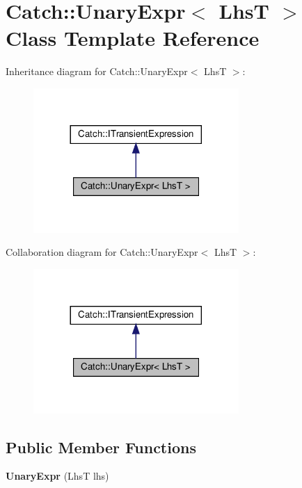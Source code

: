 \hypertarget{classCatch_1_1UnaryExpr}{}\section{Catch\+::Unary\+Expr$<$ LhsT $>$ Class Template Reference}
\label{classCatch_1_1UnaryExpr}


Inheritance diagram for Catch\+::Unary\+Expr$<$ LhsT $>$\+:\nopagebreak
\begin{figure}[H]
\begin{center}
\leavevmode
\includegraphics[width=221pt]{classCatch_1_1UnaryExpr__inherit__graph}
\end{center}
\end{figure}


Collaboration diagram for Catch\+::Unary\+Expr$<$ LhsT $>$\+:\nopagebreak
\begin{figure}[H]
\begin{center}
\leavevmode
\includegraphics[width=221pt]{classCatch_1_1UnaryExpr__coll__graph}
\end{center}
\end{figure}
\subsection*{Public Member Functions}
\begin{DoxyCompactItemize}
\item 
\mbox{\label{classCatch_1_1UnaryExpr_ae02f666a1e64da728628aa2033e1d6e7}} 
{\bfseries Unary\+Expr} (LhsT lhs)
\end{DoxyCompactItemize}
